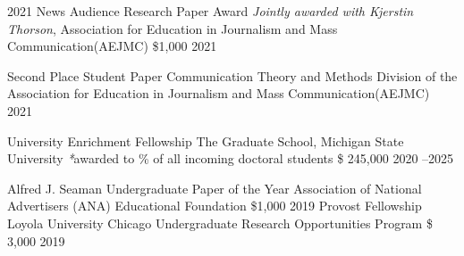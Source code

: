 

\begin{cvhonors}
    \cvhonor
    {2021 News Audience Research Paper Award} %
    { \textit{Jointly awarded with Kjerstin Thorson}, Association for Education in Journalism and Mass Communication(AEJMC) } %
    {\$1,000} %
    {2021} %
    
    \cvhonor
    {Second Place Student Paper} %
    {Communication Theory and Methods Division of the Association for Education in Journalism and Mass Communication(AEJMC) } %
    {} %
    {2021} %

    \cvhonor
    {University Enrichment Fellowship} %
    {The Graduate School, Michigan State University \scriptsize{\textit{*}awarded to  \% of all incoming doctoral students}} %
    {\$ 245,000} %
    {2020 --2025} %

    \cvhonor
    {Alfred J. Seaman Undergraduate Paper of the Year} %
    {Association of National Advertisers (ANA) Educational Foundation} %
    {\$1,000} %
    {2019} %
    \cvhonor
    {Provost Fellowship} 
    {Loyola University Chicago Undergraduate Research Opportunities Program } 
    {\$ 3,000} 
    {2019} 

\end{cvhonors}

